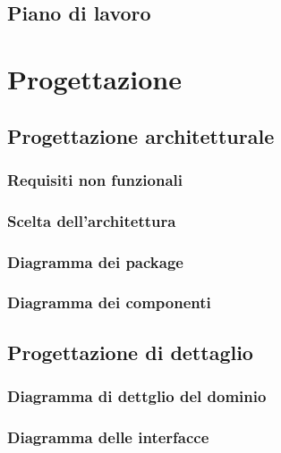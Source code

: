 \documentclass{article}
\begin{document}
\subsection{Piano di lavoro}




\pagebreak
\section{Progettazione}

\subsection{Progettazione architetturale}
\subsubsection{Requisiti non funzionali}

\subsubsection{Scelta dell'architettura}

\subsubsection{Diagramma dei package}

\subsubsection{Diagramma dei componenti}


\subsection{Progettazione di dettaglio}
\subsubsection{Diagramma di dettglio del dominio}

\subsubsection{Diagramma delle interfacce}

\end{document}
